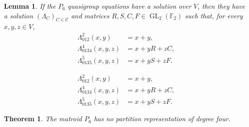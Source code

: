 \documentclass[10pt,a4paper]{amsart}
\newtheorem{lemma}{Lemma}
\newtheorem{theorem}{Theorem}
\newcommand{\F}{\mathbb F}
\newcommand{\GL}{\operatorname{GL}}
\begin{document}
\begin{lemma}\label{lem:p6-ternary}
If the $P_6$ quasigroup equations have a solution over $V$, then they have a
solution $(\Lambda_C)_{C\in\mathcal C}$ and matrices
$R,S,C,F\in\GL_2(\F_2)$ such that, for every $x,y,z\in V$,
\begin{align}
\Lambda_{012}^{2}(x,y)&=x+y,\label{eq:p6normal1}\\
\Lambda_{0134}^{4}(x,y,z)&=x+yR+zC,\label{eq:p6normal2}\\
\Lambda_{0135}^{5}(x,y,z)&=x+yS+zF.\label{eq:p6normal3}
\end{align}
\end{lemma}

\begin{align}
\Lambda_{012}^{2}(x,y)&=x+y,\\
\Lambda_{0134}^{4}(x,y,z)&=x+yR+zC,\\
\Lambda_{0135}^{5}(x,y,z)&=x+yS+zF.
\end{align}

\begin{theorem}\label{lem:p6}
The matroid $P_6$ has no partition representation of degree four.
\end{theorem}
\end{document}
